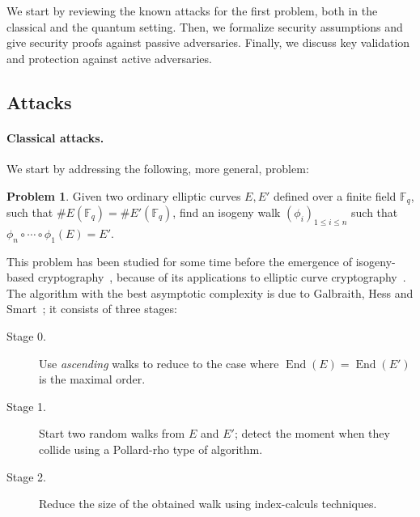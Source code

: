 \documentclass{article}
\newcommand{\F}{\mathbb{F}}
\theoremstyle{definition}
\newtheorem{prob}[theorem]{Problem}
\DeclareMathOperator{\End}{End}
\begin{document}
We start by reviewing the known attacks for the first problem, both in
the classical and the quantum setting. Then, we formalize security
assumptions and give security proofs against passive adversaries.
Finally, we discuss key validation and protection against active
adversaries.

\subsection{Attacks}
\label{sec:attacks}

\paragraph{Classical attacks.}
We start by addressing the following, more general, problem:

\begin{prob}
  Given two ordinary elliptic curves $E,E'$ defined over a finite
  field $\F_q$, such that $\#E(\F_q)=\#E'(\F_q)$, find an isogeny walk
  $(ϕ_i)_{1≤i≤n}$ such that $ϕ_n∘\cdots∘ϕ_1(E)=E'$.
\end{prob}

This problem has been studied for some time before the emergence of
isogeny-based cryptography~\cite{Gal,GHS,galbraith+stolbunov11},
because of its applications to elliptic curve
cryptography~\cite{GHS,teske06,jao+miller+venkatesan09}.  The
algorithm with the best asymptotic complexity is due to Galbraith,
Hess and Smart~\cite{GHS}; it consists of three stages:
\begin{description}
\item[Stage 0.] Use \emph{ascending} walks to reduce to the case where
  $\End(E)=\End(E')$ is the maximal order.
\item[Stage 1.] Start two random walks from $E$ and $E'$; detect the
  moment when they collide using a Pollard-rho type of algorithm.
\item[Stage 2.] Reduce the size of the obtained walk using
  index-calculs techniques.
\end{description}
\end{document}
